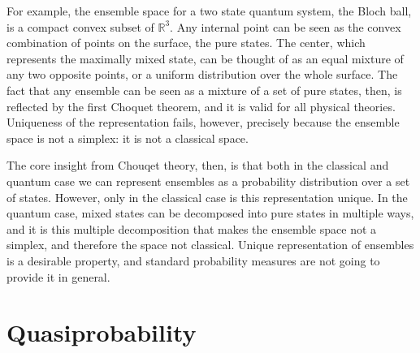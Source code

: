 \documentclass[10pt,twocolumn, nofootinbib]{revtex4-2}
\begin{document}
For example, the ensemble space for a two state quantum system, the Bloch ball, is a compact convex subset of $\mathbb{R}^3$. Any internal point can be seen as the convex combination of points on the surface, the pure states. The center, which represents the maximally mixed state, can be thought of as an equal mixture of any two opposite points, or a uniform distribution over the whole surface. The fact that any ensemble can be seen as a mixture of a set of pure states, then, is reflected by the first Choquet theorem, and it is valid for all physical theories. Uniqueness of the representation fails, however, precisely because the ensemble space is not a simplex: it is not a classical space.

The core insight from Chouqet theory, then, is that both in the classical and quantum case we can represent ensembles as a probability distribution over a set of states. However, only in the classical case is this representation unique. In the quantum case, mixed states can be decomposed into pure states in multiple ways, and it is this multiple decomposition that makes the ensemble space not a simplex, and therefore the space not classical. Unique representation of ensembles is a desirable property, and standard probability measures are not going to provide it in general.

\section{Quasiprobability}




\end{document}
